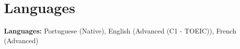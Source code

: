 \documentclass[10pt,a4paper]{article}
\begin{document}
\section{Languages}
\small
\noindent\textbf{Languages:}
Portuguese (Native), English (Advanced (C1 - TOEIC)), French (Advanced)\\[1.5pt]
\end{document}
